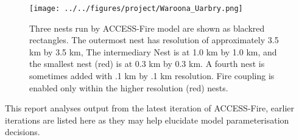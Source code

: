     \begin{figure}
      \texttt{[image: ../../figures/project/Waroona\_Uarbry.png]}
      \caption{Three nests run by ACCESS-Fire model are shown as black\/red rectangles. 
      The outermost nest has resolution of approximately 3.5 km by 3.5 km, 
      The intermediary Nest is at 1.0 km by 1.0 km, and the smallest nest (red) is at 0.3 km by 0.3 km.
      A fourth nest is sometimes added 
      with .1 km by .1 km resolution.
      Fire coupling is enabled only within the higher resolution (red) nests.}
      \label{fig:model:nests}
    \end{figure}
    
    This report analyses output from the latest iteration of ACCESS-Fire, earlier iterations are listed here as they may help elucidate model parameterisation decisions. 
